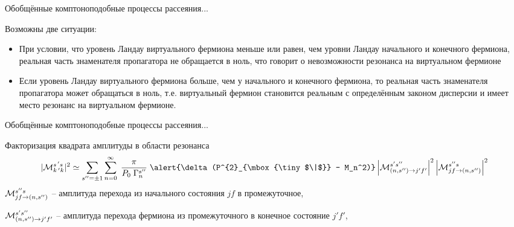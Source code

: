 \documentclass{beamer}
\def\mprl{\mbox{\tiny $\|$}}
\begin{document}
\begin{frame}{Обобщённые комптоноподобные процессы рассеяния...}
\begin{center}

Возможны две ситуации:
\begin{itemize}
\item
При условии, что уровень Ландау виртуального фермиона меньше или равен, чем 
уровни Ландау начального и конечного фермиона, реальная часть знаменателя пропагатора
не обращается в ноль, что говорит о невозможности резонанса на виртуальном фермионе

\vspace*{3mm}

\item Если уровень Ландау виртуального фермиона больше, чем 
у начального и конечного фермиона, то реальная часть знаменателя пропагатора может обращаться в ноль, 
т.е. виртуальный фермион становится реальным с определённым законом дисперсии и 
имеет место резонанс на виртуальном фермионе.

\end{itemize}
\end{center}
\end{frame}
\begin{frame}{Обобщённые комптоноподобные процессы рассеяния...}
\begin{center}
Факторизация квадрата амплитуды в области резонанса
$$|{\cal M}^{s^{\, \prime} s}_{k^{\, \prime} k}|^2 \simeq  \sum\limits_{s''=\pm 1} \sum\limits_{n=0}^{\infty} \;  
\frac{\pi}{P_0 \; \Gamma_n^{s''}} \; \alert{\delta (P^{2}_{\mprl} - M_n^2)}
\left |{\cal M}^{s' s''}_{(n,s'') \to j'f'}\right |^2 \left |{\cal M}^{s'' s}_{jf \to (n, s'')}\right |^2$$ 
${\cal M}^{s'' s}_{jf \to (n, s'')}$ -- амплитуда перехода из начального состояния $jf$ в 
промежуточное, 

${\cal M}^{s' s''}_{(n,s'') \to j'f'}$ -- амплитуда перехода фермиона 
из промежуточного в конечное состояние $j'f'$,
\end{center}
\end{frame}
\end{document}
